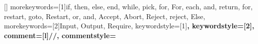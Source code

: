 \usepackage[T1]{fontenc}
\usepackage{amsmath, amsfonts,} %

\usepackage{longtable} 

\usepackage{placeins} %
\usepackage{float}
\usepackage{color} %
\usepackage{tikz}
\usepackage{lscape}
\usetikzlibrary{positioning, calc, math}
\usepackage{tikz-cd} %
\usepackage{listings} %
\usepackage{stmaryrd} %
\usepackage{booktabs} %


[]{}{
	morekeywords=[1]{if, then, else, end, while, pick, for, For, each, and, 
return, for, restart, goto,
			Restart, or, and, Accept, Abort, Reject, reject, Else},
	morekeywords=[2]{Input, Output, Require},
	keywordstyle=[1]\color{keywordsoneColor}\bfseries,
	keywordstyle=[2]\color{keywordstwoColor}\bfseries,
	comment=[l]{//},
	commentstyle=\color{purple}\ttfamily
}

\usepackage{todonotes}

\usepackage[lambda,
            advantage,
            adversary,
            probability,
            operators,
            keys,
            asymptotics,
            sets]{cryptocode}
